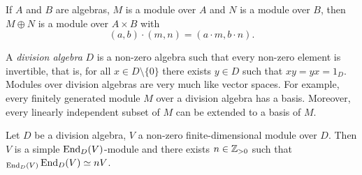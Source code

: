 \begin{exercise}
If $A$ and $B$ are algebras, $M$ is a module over $A$ and $N$ is a module over $B$, then 
    $M\oplus N$ is a module over $A\times B$ with 
    \[
    (a,b)\cdot (m,n)=(a\cdot m,b\cdot n).
    \]
\end{exercise}


\lecture\label{lec:ArtinWedderburn}
A \emph{division algebra} $D$ is a non-zero algebra such that every non-zero
element is invertible, that is, for all $x\in D\setminus\{0\}$ there exists
$y\in D$ such that $xy=yx=1_D$.  Modules over division algebras are very much
like vector spaces.  For example, every finitely generated module $M$ over a
division algebra has a basis.  Moreover, every linearly independent subset of
$M$ can be extended to a basis of $M$. 

\begin{proposition}
  Let $D$ be a division algebra, $V$ a non-zero finite-dimensional module over
  $D$. Then $V$ is a simple $\operatorname{End}_D(V)$-module and there exists
  $n\in\mathbb{Z}_{>0}$ such that ${}_{\operatorname{End}_D(V)}\operatorname{End}_D(V)\simeq nV$. 
\end{proposition}

